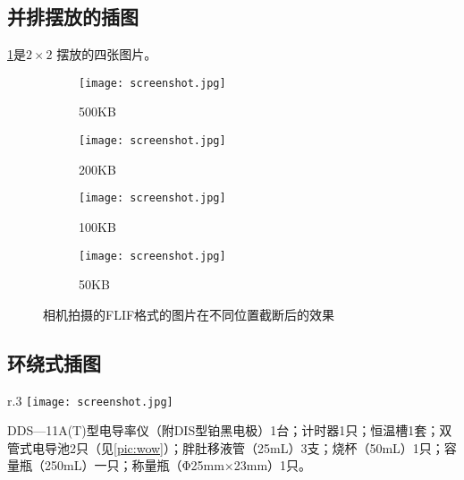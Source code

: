 \documentclass{dreamClass}
\begin{document}
\subsection{并排摆放的插图}
\cref{pic:flag}是\(2 \times 2\) 摆放的四张图片。
\begin{figure}[H]
    \centering
    \begin{subfigure}{.3\textwidth}
        \centering
        \texttt{[image: screenshot.jpg]}
        \caption{500KB}
    \end{subfigure}%
    \begin{subfigure}{.3\textwidth}
        \centering
        \texttt{[image: screenshot.jpg]}
        \caption{200KB}
    \end{subfigure}

    \begin{subfigure}{.3\textwidth}
        \centering
        \texttt{[image: screenshot.jpg]}
        \caption{100KB}
    \end{subfigure}%
    \begin{subfigure}{.3\textwidth}
        \centering
        \texttt{[image: screenshot.jpg]}
        \caption{50KB}
    \end{subfigure}
    \caption{相机拍摄的FLIF格式的图片在不同位置截断后的效果\label{pic:flag}}
\end{figure}

\subsection{环绕式插图}
\begin{wrapfigure}{r}{.3\textwidth}
    \centering
    \texttt{[image: screenshot.jpg]}
    \caption{双管式电导池示意图}\label{pic:wow}
\end{wrapfigure}
DDS—11A(T)型电导率仪（附DIS型铂黑电极）1台；计时器1只；恒温槽1套；双管式电导池2只（见\cref{pic:wow}）；胖肚移液管（25mL）3支；烧杯（50mL）1只；容量瓶（250mL）一只；称量瓶（Φ25mm×23mm）1只。
\end{document}

